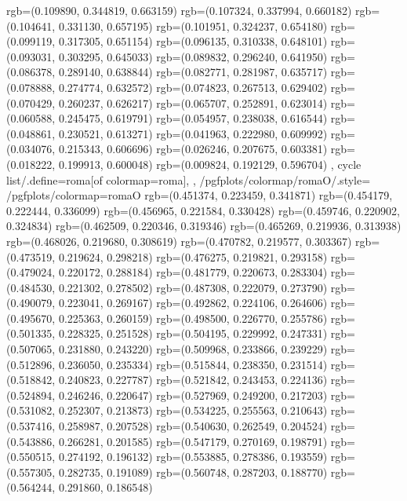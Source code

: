 {{{					rgb=(0.109890, 0.344819, 0.663159)
					rgb=(0.107324, 0.337994, 0.660182)
					rgb=(0.104641, 0.331130, 0.657195)
					rgb=(0.101951, 0.324237, 0.654180)
					rgb=(0.099119, 0.317305, 0.651154)
					rgb=(0.096135, 0.310338, 0.648101)
					rgb=(0.093031, 0.303295, 0.645033)
					rgb=(0.089832, 0.296240, 0.641950)
					rgb=(0.086378, 0.289140, 0.638844)
					rgb=(0.082771, 0.281987, 0.635717)
					rgb=(0.078888, 0.274774, 0.632572)
					rgb=(0.074823, 0.267513, 0.629402)
					rgb=(0.070429, 0.260237, 0.626217)
					rgb=(0.065707, 0.252891, 0.623014)
					rgb=(0.060588, 0.245475, 0.619791)
					rgb=(0.054957, 0.238038, 0.616544)
					rgb=(0.048861, 0.230521, 0.613271)
					rgb=(0.041963, 0.222980, 0.609992)
					rgb=(0.034076, 0.215343, 0.606696)
					rgb=(0.026246, 0.207675, 0.603381)
					rgb=(0.018222, 0.199913, 0.600048)
					rgb=(0.009824, 0.192129, 0.596704)
			},
		cycle list/.define={roma}{[of colormap=roma]},
		},
		/pgfplots/colormap/romaO/.style={
			/pgfplots/colormap={romaO}{%
					rgb=(0.451374, 0.223459, 0.341871)
					rgb=(0.454179, 0.222444, 0.336099)
					rgb=(0.456965, 0.221584, 0.330428)
					rgb=(0.459746, 0.220902, 0.324834)
					rgb=(0.462509, 0.220346, 0.319346)
					rgb=(0.465269, 0.219936, 0.313938)
					rgb=(0.468026, 0.219680, 0.308619)
					rgb=(0.470782, 0.219577, 0.303367)
					rgb=(0.473519, 0.219624, 0.298218)
					rgb=(0.476275, 0.219821, 0.293158)
					rgb=(0.479024, 0.220172, 0.288184)
					rgb=(0.481779, 0.220673, 0.283304)
					rgb=(0.484530, 0.221302, 0.278502)
					rgb=(0.487308, 0.222079, 0.273790)
					rgb=(0.490079, 0.223041, 0.269167)
					rgb=(0.492862, 0.224106, 0.264606)
					rgb=(0.495670, 0.225363, 0.260159)
					rgb=(0.498500, 0.226770, 0.255786)
					rgb=(0.501335, 0.228325, 0.251528)
					rgb=(0.504195, 0.229992, 0.247331)
					rgb=(0.507065, 0.231880, 0.243220)
					rgb=(0.509968, 0.233866, 0.239229)
					rgb=(0.512896, 0.236050, 0.235334)
					rgb=(0.515844, 0.238350, 0.231514)
					rgb=(0.518842, 0.240823, 0.227787)
					rgb=(0.521842, 0.243453, 0.224136)
					rgb=(0.524894, 0.246246, 0.220647)
					rgb=(0.527969, 0.249200, 0.217203)
					rgb=(0.531082, 0.252307, 0.213873)
					rgb=(0.534225, 0.255563, 0.210643)
					rgb=(0.537416, 0.258987, 0.207528)
					rgb=(0.540630, 0.262549, 0.204524)
					rgb=(0.543886, 0.266281, 0.201585)
					rgb=(0.547179, 0.270169, 0.198791)
					rgb=(0.550515, 0.274192, 0.196132)
					rgb=(0.553885, 0.278386, 0.193559)
					rgb=(0.557305, 0.282735, 0.191089)
					rgb=(0.560748, 0.287203, 0.188770)
					rgb=(0.564244, 0.291860, 0.186548)
}}}
